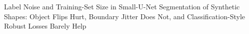 Label Noise and Training-Set Size in Small-U-Net Segmentation of Synthetic Shapes: Object Flips Hurt, Boundary Jitter Does Not, and Classification-Style Robust Losses Barely Help
